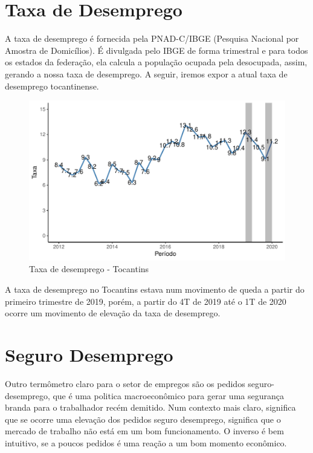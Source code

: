 \section{Taxa de Desemprego}

\par A taxa de desemprego é fornecida pela PNAD-C/IBGE (Pesquisa Nacional por Amostra de Domicílios). É divulgada pelo IBGE de forma trimestral e para todos os estados da federação, ela calcula a população ocupada pela desocupada, assim, gerando a nossa taxa de desemprego. A seguir, iremos expor a atual taxa de desemprego tocantinense.

\begin{figure}[h]
	\caption{Taxa de desemprego - Tocantins}
	\includegraphics[width=\linewidth]{fig/taxa de desemprego - Tocantins.pdf}
\end{figure}

\par A taxa de desemprego no Tocantins estava num movimento de queda a partir do primeiro trimestre de 2019, porém, a partir do 4T de 2019 até o 1T de 2020 ocorre um movimento de elevação da taxa de desemprego.

\section{Seguro Desemprego}

\par Outro termômetro claro para o setor de empregos são os pedidos seguro-desemprego, que é uma politica macroeconômico para gerar uma segurança branda para o trabalhador recém demitido. Num contexto mais claro, significa que se ocorre uma elevação dos pedidos seguro desemprego, significa que o mercado de trabalho não está em um bom funcionamento. O inverso é bem intuitivo, se a poucos pedidos é uma reação a um bom momento econômico.

